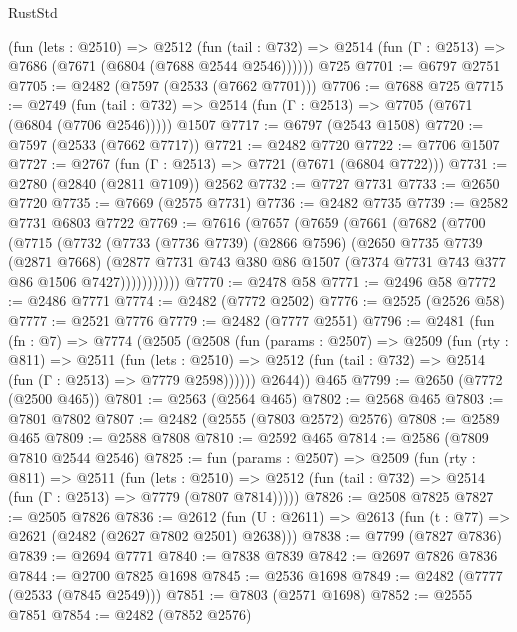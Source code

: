 \begin{lexlean}{RustStd}
\begin{coremodule}
    (fun (lets : @2510) =>
    @2512
      (fun (tail : @732) => @2514 (fun (Γ : @2513) => @7686 (@7671 (@6804 (@7688 @2544 @2546))))))
    @725
@7701 := @6797 @2751
@7705 := @2482 (@7597 (@2533 (@7662 @7701)))
@7706 := @7688 @725
@7715 := @2749
    (fun (tail : @732) => @2514 (fun (Γ : @2513) => @7705 (@7671 (@6804 (@7706 @2546)))))
    @1507
@7717 := @6797 (@2543 @1508)
@7720 := @7597 (@2533 (@7662 @7717))
@7721 := @2482 @7720
@7722 := @7706 @1507
@7727 := @2767 (fun (Γ : @2513) => @7721 (@7671 (@6804 @7722)))
@7731 := @2780 (@2840 (@2811 @7109)) @2562
@7732 := @7727 @7731
@7733 := @2650 @7720
@7735 := @7669 (@2575 @7731)
@7736 := @2482 @7735
@7739 := @2582 @7731 @6803 @7722
@7769 := @7616
    (@7657
      (@7659
        (@7661
          (@7682
            (@7700
              (@7715
                (@7732
                  (@7733
                    (@7736 @7739)
                    (@2866 @7596)
                    (@2650
                      @7735
                      @7739
                      (@2871 @7668)
                      (@2877
                        @7731
                        @743
                        @380
                        @86
                        @1507
                        (@7374 @7731 @743 @377 @86 @1506 @7427)))))))))))
@7770 := @2478 @58
@7771 := @2496 @58
@7772 := @2486 @7771
@7774 := @2482 (@7772 @2502)
@7776 := @2525 (@2526 @58)
@7777 := @2521 @7776
@7779 := @2482 (@7777 @2551)
@7796 := @2481
    (fun (fn : @7) =>
    @7774
      (@2505
        (@2508
          (fun (params : @2507) =>
          @2509
            (fun (rty : @811) =>
            @2511
              (fun (lets : @2510) =>
              @2512 (fun (tail : @732) => @2514 (fun (Γ : @2513) => @7779 @2598))))))
        @2644))
    @465
@7799 := @2650 (@7772 (@2500 @465))
@7801 := @2563 (@2564 @465)
@7802 := @2568 @465
@7803 := @7801 @7802
@7807 := @2482 (@2555 (@7803 @2572) @2576)
@7808 := @2589 @465
@7809 := @2588 @7808
@7810 := @2592 @465
@7814 := @2586 (@7809 @7810 @2544 @2546)
@7825 := fun (params : @2507) =>
  @2509
    (fun (rty : @811) =>
    @2511
      (fun (lets : @2510) =>
      @2512 (fun (tail : @732) => @2514 (fun (Γ : @2513) => @7779 (@7807 @7814)))))
@7826 := @2508 @7825
@7827 := @2505 @7826
@7836 := @2612 (fun (U : @2611) => @2613 (fun (t : @77) => @2621 (@2482 (@2627 @7802 @2501) @2638)))
@7838 := @7799 (@7827 @7836)
@7839 := @2694 @7771
@7840 := @7838 @7839
@7842 := @2697 @7826 @7836
@7844 := @2700 @7825 @1698
@7845 := @2536 @1698
@7849 := @2482 (@7777 (@2533 (@7845 @2549)))
@7851 := @7803 (@2571 @1698)
@7852 := @2555 @7851
@7854 := @2482 (@7852 @2576)

\end{coremodule}
\end{lexlean}

